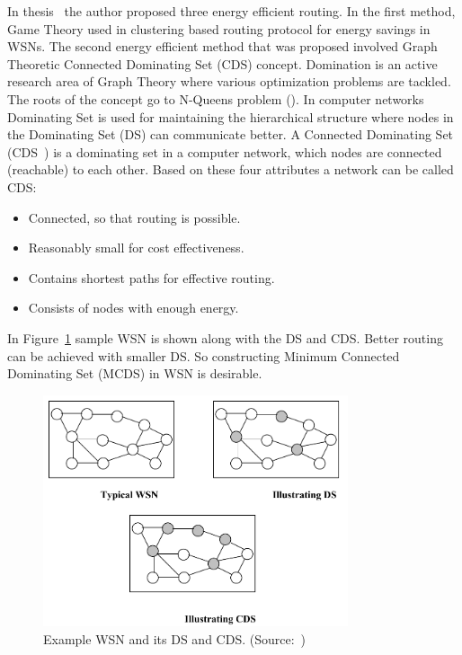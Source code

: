 \documentclass[12pt, oneandhalf, chaparabic, sees, ms]{metu}
\begin{document}
In thesis~\cite{pitchai2015} the author proposed three energy efficient routing. In the first method, 
Game Theory used in clustering based routing protocol for energy savings in WSNs.
The second energy efficient method that was proposed involved Graph Theoretic Connected Dominating Set (CDS) concept.
Domination is an active research area of Graph Theory where various optimization problems are tackled. 
The roots of the concept go to N-Queens problem (\cite{bell2009}). In computer networks Dominating Set is used for
maintaining the hierarchical structure where nodes in the Dominating Set (DS) can communicate better.
A Connected Dominating Set (CDS~\cite{cds}) is a dominating
set in a computer network, which nodes are connected (reachable) to each other.
Based on these four attributes a network can be called CDS:
\vspace{-0.5cm}
\begin{itemize}
\setlength\itemsep{0em}
\item Connected, so that routing is possible.
\item Reasonably small for cost effectiveness.
\item Contains shortest paths for effective routing.
\item Consists of nodes with enough energy.
\end{itemize}
\vspace{-0.5cm}
In Figure~\ref{fig:cds} sample WSN is shown along with the DS and CDS. Better routing can be achieved with smaller DS. 
So constructing Minimum Connected Dominating Set (MCDS) in WSN is desirable.
% 
%
%
\begin{figure}[!htbp]
 \begin{center}
  \includegraphics[width=0.80\textwidth]{cds.png}
 \end{center}
 \caption{Example WSN and its DS and CDS. (Source:~\protect\cite{pitchai2015})}
  \label{fig:cds}
\end{figure}
% 
%
%
\end{document}
